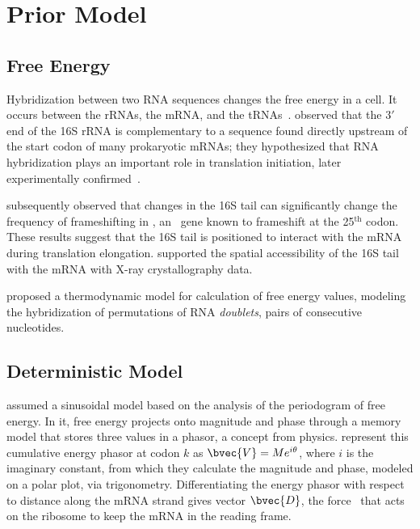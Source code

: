 \documentclass[12pt]{article}
\begin{document}
\section{Prior Model}
\subsection{Free Energy}
\label{freeenergy}

Hybridization between two RNA sequences changes the free energy in a cell.
It occurs between the rRNAs, the mRNA, and the tRNAs~\cite{starmer}.
\citet{sd} observed that the $3'$ end of the 16S rRNA is complementary to a sequence found 
directly upstream of the start codon of many prokaryotic mRNAs; they hypothesized that RNA hybridization 
plays an important role in translation initiation, later
experimentally confirmed~\cite{hui,jacob}.

\citet{weiss87} subsequently observed that changes in the 16S tail can 
significantly change the frequency of frameshifting in \prfB, an \ecoli\ gene 
known to frameshift at the 25$^\textrm{th}$ codon.  These results suggest that 
the 16S tail is positioned to interact with the mRNA during translation elongation. 
\citet{xray} supported the spatial accessibility of the 16S tail with the mRNA with 
X-ray crystallography data.

\citet{freier} proposed a thermodynamic model for calculation of free energy values,
modeling the hybridization of permutations of RNA \emph{doublets}, pairs of consecutive nucleotides.

\subsection{Deterministic Model}
\citet{lalit:mechanics} assumed a sinusoidal model 
based on the analysis of the periodogram of free energy. In it,
free energy projects onto magnitude and
phase through a memory model that stores three values
in a phasor, a concept from physics. 
\citeauthor{lalit:mechanics} represent this cumulative energy phasor
at codon $k$ as $\bvec{V} = Me^{i\theta}$, where $i$ is the imaginary
constant, from which they calculate the magnitude and phase, modeled
on a polar plot, via
trigonometry. Differentiating the energy phasor
with respect to distance along the mRNA strand gives 
vector $\bvec{D}$, the force~\cite{lalit:mechanics}
that acts on the ribosome to keep the mRNA in the reading frame.
 
\end{document}
